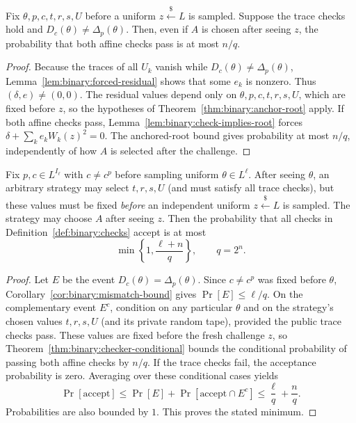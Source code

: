 \begin{theorem}\label{thm:binary:checker-conditional}
Fix $\theta,p,c,t,r,s,U$ before a uniform
$z\overset{\$}{\leftarrow}L$ is sampled.
Suppose the trace checks hold and
$D_c(\theta)\neq\Delta_p(\theta)$.
Then, even if $A$ is chosen after seeing $z$,
the probability that both affine checks pass
is at most $n/q$.
\end{theorem}
\begin{proof}
Because the traces of all $U_k$ vanish while
$D_c(\theta)\neq\Delta_p(\theta)$,
Lemma~\ref{lem:binary:forced-residual}
shows that some $e_k$ is nonzero.
Thus $(\delta,e)\neq(0,0)$.
The residual values depend only on
$\theta,p,c,t,r,s,U$, which are fixed before $z$,
so the hypotheses of Theorem~\ref{thm:binary:anchor-root}
apply. If both affine checks pass,
Lemma~\ref{lem:binary:check-implies-root}
forces
$\delta+\sum_ke_kW_k(z)^2=0$.
The anchored-root bound gives probability
at most $n/q$, independently of how $A$
is selected after the challenge.
\end{proof}

\begin{theorem}\label{thm:binary:two-challenge}
Fix $p,c\in L^{I_\ell}$ with $c\neq c^p$ before
sampling uniform $\theta\in L^\ell$.
After seeing $\theta$, an arbitrary strategy
may select $t,r,s,U$ (and must satisfy all trace
checks), but these values must be fixed
\emph{before} an independent uniform
$z\overset{\$}{\leftarrow}L$ is sampled.
The strategy may choose $A$ after seeing $z$.
Then the probability that all checks in
Definition~\ref{def:binary:checks} accept is at most
\[
 \boxed{
 \min\left\{1,\frac{\ell+n}{q}\right\},
 \qquad q=2^n.
 }
\]
\end{theorem}
\begin{proof}
Let $E$ be the event
$D_c(\theta)=\Delta_p(\theta)$.
Since $c\neq c^p$ was fixed before $\theta$,
Corollary~\ref{cor:binary:mismatch-bound}
gives $\Pr[E]\leq\ell/q$.
On the complementary event $E^c$,
condition on any particular $\theta$ and on
the strategy's chosen values $t,r,s,U$
(and its private random tape), provided
the public trace checks pass.
These values are fixed before the fresh
challenge $z$, so
Theorem~\ref{thm:binary:checker-conditional}
bounds the conditional probability of
passing both affine checks by $n/q$.
If the trace checks fail, the acceptance
probability is zero. Averaging over these
conditional cases yields
\[
 \Pr[\text{accept}]
 \leq\Pr[E]+\Pr[\text{accept}\cap E^c]
 \leq\frac{\ell}{q}+\frac{n}{q}.
\]
Probabilities are also bounded by $1$.
This proves the stated minimum.
\end{proof}

